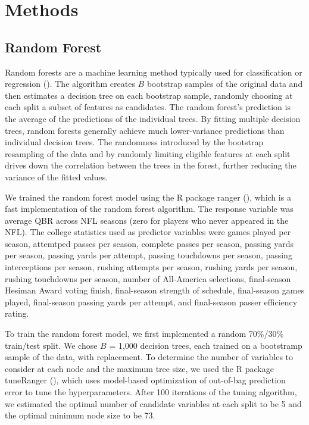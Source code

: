 \documentclass{article}
\begin{document}
\section{Methods}
\label{sec:methods}

\subsection{Random Forest}

Random forests are a machine learning method typically used for classification or regression (\cite{breiman_random_2001}). The algorithm creates $B$ bootstrap samples of the original data and then estimates a decision tree on each bootstrap sample, randomly choosing at each split a subset of features as candidates. The random forest's prediction is the average of the predictions of the individual trees. By fitting multiple decision trees, random forests generally achieve much lower-variance predictions than individual decision trees. The randomness introduced by the bootstrap resampling of the data and by randomly limiting eligible features at each split drives down the correlation between the trees in the forest, further reducing the variance of the fitted values.

We trained the random forest model using the R package ranger (\cite{wright_ranger_2024}), which is a fast implementation of the random forest algorithm. The response variable was average QBR across NFL seasons (zero for players who never appeared in the NFL). The college statistics used as predictor variables were games played per season, attemtped passes per season, complete passes per season, passing yards per season, passing yards per attempt, passing touchdowns per season, passing interceptions per season, rushing attempts per season, rushing yards per season, rushing touchdowns per season, number of All-America selections, final-season Hesiman Award voting finish, final-season strength of schedule, final-season games played, final-season passing yards per attempt, and final-season passer efficiency rating.

To train the random forest model, we first implemented a random 70\%/30\% train/test split. We chose $B$ = 1,000 decision trees, each trained on a bootstramp sample of the data, with replacement. To determine the number of variables to consider at each node and the maximum tree size, we used the R package tuneRanger (\cite{probst_tuneranger_2024}), which uses model-based optimization of out-of-bag prediction error to tune the hyperparameters. After 100 iterations of the tuning algorithm, we estimated the optimal number of candidate variables at each split to be 5 and the optimal minimum node size to be 73.
\end{document}
